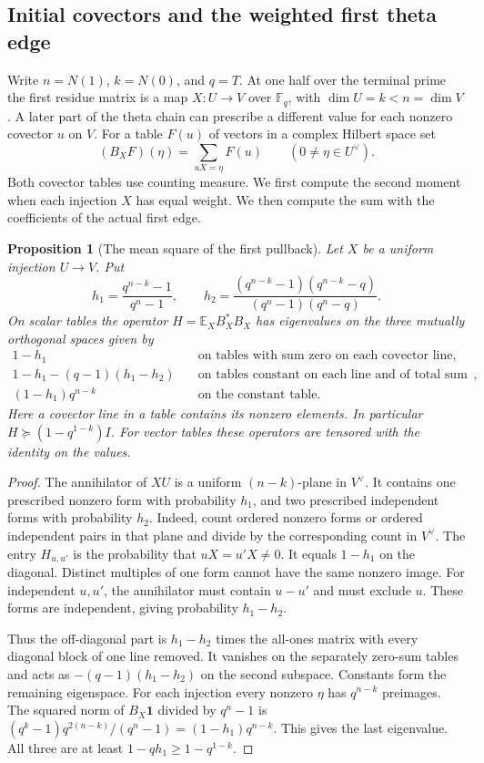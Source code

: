 \documentclass[a4paper,11pt]{article}
\newtheorem{proposition}{Proposition}[section]
\theoremstyle{definition}
\theoremstyle{remark}
\numberwithin{equation}{section}
\begin{document}
\subsection{Initial covectors and the weighted first theta edge}
\label{sec:firstresidue395}

Write \(n=N(1)\), \(k=N(0)\), and \(q=T\). At one half over
the terminal prime the first residue matrix is a map
\(X:U\to V\) over \(\mathbb F_q\), with \(\dim U=k<n=\dim V\).
A later part of the theta chain can prescribe a different value
for each nonzero covector \(u\) on \(V\). For a table \(F(u)\)
of vectors in a complex Hilbert space set
\[
            (B_X F)(\eta)=\sum_{uX=\eta}F(u)
                    \qquad(0\ne\eta\in U^\vee).
\]
Both covector tables use counting measure. We first compute the
second moment when each injection \(X\) has equal weight. We then
compute the sum with the coefficients of the actual first edge.

\begin{proposition}[The mean square of the first pullback]
\label{prop:firstincidence395}
Let \(X\) be a uniform injection \(U\to V\). Put
\[
 h_1=\frac{q^{n-k}-1}{q^n-1},\qquad
 h_2=\frac{(q^{n-k}-1)(q^{n-k}-q)}
               {(q^n-1)(q^n-q)} .
\]
On scalar tables the operator \(H=\mathbb E_X B_X^*B_X\) has
eigenvalues on the three mutually orthogonal spaces given by
\begin{align*}
 1-h_1
       &\quad\text{on tables with sum zero on each covector line},\\
 1-h_1-(q-1)(h_1-h_2)
       &\quad\text{on tables constant on each line and of total sum zero},\\
 (1-h_1)q^{n-k}
       &\quad\text{on the constant table}.
\end{align*}
Here a covector line in a table contains its nonzero elements.
In particular \(H\succeq(1-q^{1-k})I\). For vector tables
these operators are tensored with the identity on the values.
\end{proposition}
\begin{proof}
The annihilator of \(XU\) is a uniform \((n-k)\)-plane in
\(V^\vee\). It contains one prescribed nonzero form with
probability \(h_1\), and two prescribed independent forms
with probability \(h_2\). Indeed, count ordered nonzero forms
or ordered independent pairs in that plane and divide by the
corresponding count in \(V^\vee\). The entry \(H_{u,u'}\)
is the probability that \(uX=u'X\ne0\). It equals \(1-h_1\)
on the diagonal. Distinct multiples of one form cannot have
the same nonzero image. For independent \(u,u'\), the
annihilator must contain \(u-u'\) and must exclude \(u\).
These forms are independent, giving probability \(h_1-h_2\).

Thus the off-diagonal part is \(h_1-h_2\) times the all-ones
matrix with every diagonal block of one line removed. It
vanishes on the separately zero-sum tables and acts as
\(-(q-1)(h_1-h_2)\) on the second subspace. Constants form
the remaining eigenspace. For each injection every nonzero
\(\eta\) has \(q^{n-k}\) preimages. The squared norm
of \(B_X\mathbf1\) divided by \(q^n-1\) is
\((q^k-1)q^{2(n-k)}/(q^n-1)=(1-h_1)q^{n-k}\).
This gives the last eigenvalue. All three are at least
\(1-qh_1\ge1-q^{1-k}\).
\end{proof}
\end{document}

